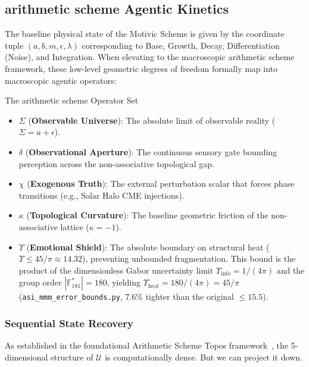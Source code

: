 \subsection{arithmetic scheme Agentic Kinetics}

The baseline physical state of the Motivic Scheme is given by the coordinate tuple $(a, b, m, \epsilon, \lambda)$ corresponding to Base, Growth, Decay, Differentiation (Noise), and Integration. When elevating to the macroscopic arithmetic scheme framework, these low-level geometric degrees of freedom formally map into macroscopic agentic operators:

\begin{arithmetic schemebox}{The arithmetic scheme Operator Set}
\begin{itemize}
    \item $\Sigma$ (\textbf{Observable Universe}): The absolute limit of observable reality ($\Sigma = a + \epsilon$).
    \item $\delta$ (\textbf{Observational Aperture}): The continuous sensory gate bounding perception across the non-associative topological gap.
    \item $\chi$ (\textbf{Exogenous Truth}): The external perturbation scalar that forces phase transitions (e.g., Solar Halo CME injections).
    \item $\kappa$ (\textbf{Topological Curvature}): The baseline geometric friction of the non-associative lattice ($\kappa = -1$).
    \item $\Upsilon$ (\textbf{Emotional Shield}): The absolute boundary on structural heat ($\Upsilon \le 45/\pi \approx 14.32$), preventing unbounded fragmentation. This bound is the product of the dimensionless Gabor uncertainty limit $\Upsilon_{\mathrm{info}} = 1/(4\pi)$ and the group order $|\mathbb{F}_{181}^*| = 180$, yielding $\Upsilon_{\mathrm{heat}} = 180/(4\pi) = 45/\pi$ (\texttt{asi\_mmm\_error\_bounds.py}, 7.6\% tighter than the original $\le 15.5$).
\end{itemize}
\end{arithmetic schemebox}

\subsubsection{Sequential State Recovery}

As established in the foundational Arithmetic Scheme Topos framework~\cite{larue_lc}, the 5-dimensional structure of $\mathcal{U}$ is computationally dense. But we can project it down.

